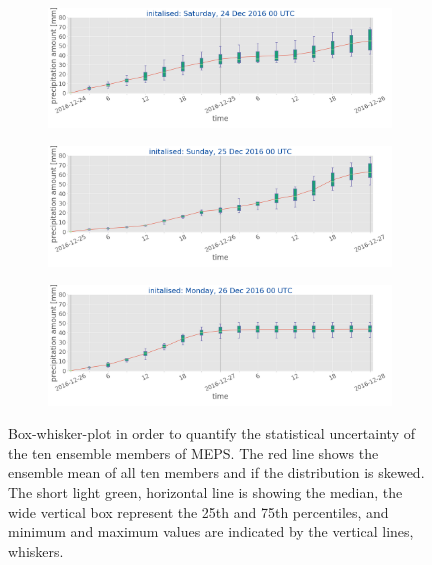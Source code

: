 \\
\begin{figure}[h!]
	\centering
	\begin{subfigure}[b]{\textwidth}
		\centering
		\includegraphics[trim ={0cm 2.2cm 0cm 0cm},clip,width=\textwidth]{./fig_boxplot_sfc/20161224_0}
		\caption{}\label{fig:boxplot:24}
	\end{subfigure}
	\begin{subfigure}[b]{\textwidth}
		\centering
		\includegraphics[trim ={0cm 2.2cm 0cm 0cm},clip,width=\textwidth]{./fig_boxplot_sfc/20161225_0}
		\caption{}\label{fig:boxplot:25}
	\end{subfigure}
	\begin{subfigure}[b]{\textwidth}
		\centering
		\includegraphics[trim ={0cm 1.cm 0cm 0cm},clip,width=\textwidth]{./fig_boxplot_sfc/20161226_0}
		\caption{}\label{fig:boxplot:26}
	\end{subfigure}
	\caption{Box-whisker-plot in order to quantify the statistical uncertainty of the ten ensemble members of MEPS. The red line shows the ensemble mean of all ten members and if the distribution is skewed. The short light green, horizontal line is showing the median, the wide vertical box represent the 25th and 75th percentiles, and minimum and maximum values are indicated by the vertical lines, whiskers.}\label{fig:boxplot}
\end{figure}
